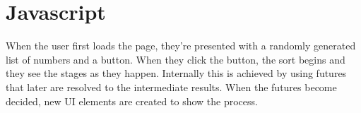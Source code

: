 \documentclass{report}
\begin{document}
\section{Javascript}
    When the user first loads the page, they're presented with a randomly generated list of numbers and a button. When they click the button, the sort begins and they see the stages as they
    happen. Internally this is achieved by using futures that later are resolved to the intermediate results. When the futures become decided, new UI elements are created to show the process.

\begin{resourcecode}
 \end{resourcecode}
\end{document}
